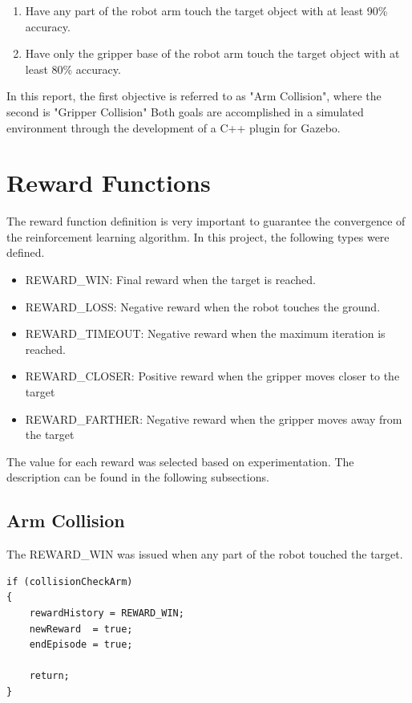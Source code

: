 \documentclass[10pt,journal,compsoc]{IEEEtran}
\begin{document}
\begin{enumerate}
  \item Have any part of the robot arm touch the target object with at least 90\% accuracy.
  \item Have only the gripper base of the robot arm touch the target object with at least 80\% accuracy.
\end{enumerate}

In this report, the first objective is referred to as "Arm Collision", where the second is "Gripper Collision"
Both goals are accomplished in a simulated environment through the development of a C++ plugin for Gazebo.





\section{Reward Functions}


The reward function definition is very important to guarantee the convergence of the reinforcement learning algorithm. In this project, the following types were defined.

\begin{itemize}
  \item REWARD\_WIN: Final reward when the target is reached.
  \item REWARD\_LOSS: Negative reward when the robot touches the ground.
  \item REWARD\_TIMEOUT: Negative reward when the maximum iteration is reached.
  \item REWARD\_CLOSER: Positive reward when the gripper moves closer to the target
  \item REWARD\_FARTHER: Negative reward when the gripper moves away from the target
\end{itemize}

The value for each reward was selected based on experimentation. The description can be found in the following subsections. 

\subsection{Arm Collision}

The REWARD\_WIN was issued when any part of the robot touched the target.
\begin{lstlisting}
if (collisionCheckArm)
{
	rewardHistory = REWARD_WIN;
	newReward  = true;
	endEpisode = true;

	return;
}
\end{lstlisting}
\end{document}
